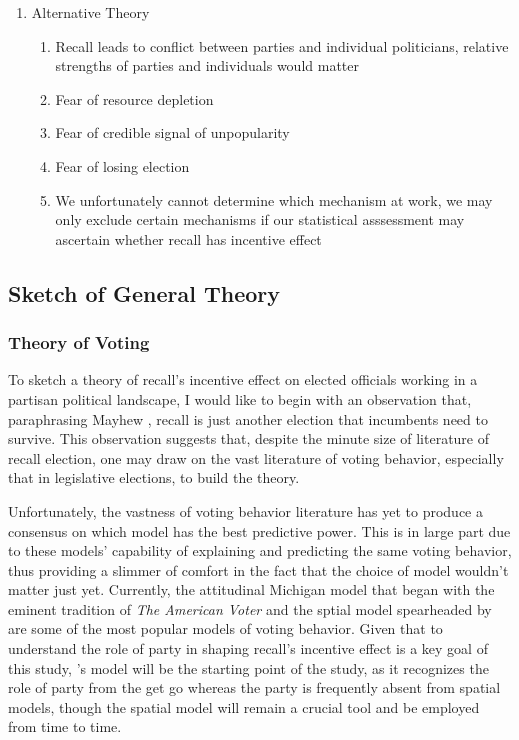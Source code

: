 \documentclass[hyphens, crop=false]{standalone}
\begin{document}
\begin{enumerate}
			\item 
			Alternative Theory
			\begin{enumerate}
				\item 
				Recall leads to conflict between parties and individual politicians, relative strengths of parties and individuals would matter
				\item 
				Fear of resource depletion
				\item 
				Fear of credible signal of unpopularity
				\item 
				Fear of losing election
				\item 
				We unfortunately cannot determine which mechanism at work, we may only exclude certain mechanisms if our statistical asssessment may ascertain whether recall has incentive effect
			\end{enumerate}
		\end{enumerate}
	
	\subsection*{Sketch of General Theory}
	
		\subsubsection*{Theory of Voting}
		To sketch a theory of recall's incentive effect on elected officials
		working in a partisan political landscape, I would like to begin with an observation that,
		paraphrasing Mayhew
		\autocite*{mayhewCongressElectoralConnection1974},
		recall is just another election that incumbents need to survive.
		This observation suggests that,
		despite the minute size of literature of recall election,
		one may draw on the vast literature of voting behavior,
		especially that in legislative elections,
		to build the theory. 
		
		Unfortunately, the vastness of voting behavior literature has
		yet to produce a consensus on which model has the best predictive power.
		This is in large part due to
		these models' capability of explaining and predicting the same voting behavior,
		thus
		providing a slimmer of comfort in the fact that the choice of model wouldn't matter just yet.
		Currently, the attitudinal Michigan model
		that began with the eminent tradition of \textit{The American Voter}
		\autocite{campbellAmericanVoter1960}
		and the sptial model spearheaded by
		\citeauthor{downsEconomicTheoryDemocracy1957}
		\autocite*{downsEconomicTheoryDemocracy1957}
		are some of the most popular models of voting behavior.
		Given that to understand the role of party in shaping recall's incentive effect is
		a key goal of this study,
		\citeauthor{campbellAmericanVoter1960}'s
		\autocite*{campbellAmericanVoter1960}
		model will be the starting point of the study,
		as it recognizes the role of party from the get go
		whereas the party is frequently absent from spatial models,
		though the spatial model will remain a crucial tool
		and be employed from time to time.
		
\end{document}
